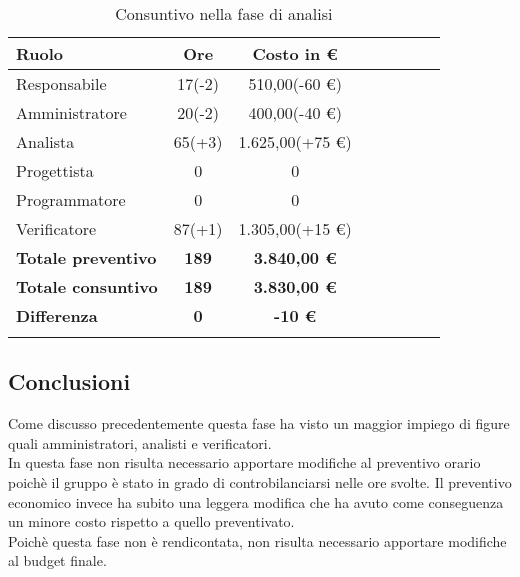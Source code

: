 \documentclass[../piano_di_progetto.tex]{subfiles}
\begin{document}
\begin{center}
	\begin{longtable}{|l|c|c|c|c|c|c|c|}
		\hline
		\rowcolor{lightgray}
		\textbf{Ruolo} & \textbf{Ore} & \textbf{Costo in €}\\
		\hline
		Responsabile & 17(-2) & 510,00(-60 €) \\
		\hline
		Amministratore & 20(-2) & 400,00(-40 €) \\
		\hline
		Analista & 65(+3) & 1.625,00(+75 €) \\
		\hline
		Progettista & 0 & 0 \\
		\hline
		Programmatore & 0 & 0 \\
		\hline
		Verificatore & 87(+1) & 1.305,00(+15 €) \\
		\hline
		\textbf{Totale preventivo} & \textbf{189} & \textbf{3.840,00 €} \\
		\hline
		\textbf{Totale consuntivo} & \textbf{189} & \textbf{3.830,00 €} \\
		\hline
		\textbf{Differenza} & \textbf{0} & \textbf{-10 €}\\
		\hline
		\rowcolor{white}
		\caption{Consuntivo nella fase di analisi}
	\end{longtable}
\end{center}

\subsection{ Conclusioni}%
\label{sub:cons_fine}
Come discusso precedentemente questa fase ha visto un maggior impiego di figure quali amministratori, analisti e verificatori.\\
In questa fase non risulta necessario apportare modifiche al preventivo orario poichè il gruppo è stato in grado di controbilanciarsi nelle ore svolte. Il preventivo economico invece ha subito una leggera modifica che ha avuto come conseguenza un minore costo rispetto a quello preventivato. \\
Poichè questa fase non è rendicontata, non risulta necessario apportare modifiche al budget finale. 
\end{document}
